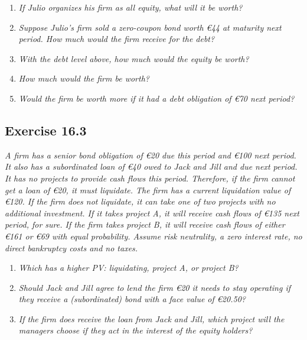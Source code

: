 \documentclass[]{book}
\newcommand{\euro}{€}
\theoremstyle{definition}
\theoremstyle{definition}
\theoremstyle{remark}
\begin{document}
\begin{enumerate}
\def\labelenumi{\alph{enumi}.}
\item
  \emph{If Julio organizes his firm as all equity, what will it be
  worth?} \citep[p.551]{book}
\item
  \emph{Suppose Julio's firm sold a zero-coupon bond worth \euro{}44 at
  maturity next period. How much would the firm receive for the debt?}
  \citep[p.551]{book}
\item
  \emph{With the debt level above, how much would the equity be worth?}
  \citep[p.551]{book}
\item
  \emph{How much would the firm be worth?} \citep[p.551]{book}
\item
  \emph{Would the firm be worth more if it had a debt obligation of
  \euro{}70 next period?} \citep[p.551]{book}
\end{enumerate}

\subsection{Exercise 16.3}\label{exercise-16.3}

\emph{A firm has a senior bond obligation of \euro{}20 due this period
and \euro{}100 next period. It also has a subordinated loan of \euro{}40
owed to Jack and Jill and due next period. It has no projects to provide
cash flows this period. Therefore, if the firm cannot get a loan of
\euro{}20, it must liquidate. The firm has a current liquidation value
of \euro{}120. If the firm does not liquidate, it can take one of two
projects with no additional investment. If it takes project A, it will
receive cash flows of \euro{}135 next period, for sure. If the firm
takes project B, it will receive cash flows of either \euro{}161 or
\euro{}69 with equal probability. Assume risk neutrality, a zero
interest rate, no direct bankruptcy costs and no taxes.}
\citep[p.551]{book}

\begin{enumerate}
\def\labelenumi{\alph{enumi}.}
\item
  \emph{Which has a higher PV: liquidating, project A, or project B?}
  \citep[p.551]{book}
\item
  \emph{Should Jack and Jill agree to lend the firm \euro{}20 it needs
  to stay operating if they receive a (subordinated) bond with a face
  value of \euro{}20.50?} \citep[p.551]{book}
\item
  \emph{If the firm does receive the loan from Jack and Jill, which
  project will the managers choose if they act in the interest of the
  equity holders?} \citep[p.551]{book}
\end{enumerate}
\end{document}
